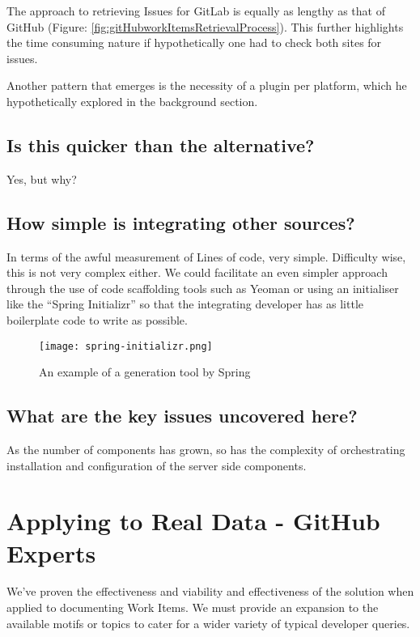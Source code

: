 The approach to retrieving Issues for GitLab is equally as lengthy as that of GitHub (Figure: \ref{fig:gitHubworkItemsRetrievalProcess}). This further highlights the time consuming nature if hypothetically one had to check both sites for issues.

Another pattern that emerges is the necessity of a plugin per platform, which he hypothetically explored in the background section.

\subsection{Is this quicker than the alternative?}

Yes, but why?

\subsection{How simple is integrating other sources?}

In terms of the awful measurement of Lines of code, very simple. Difficulty wise, this is not very complex either. We could facilitate an even simpler approach through the use of code scaffolding tools such as Yeoman or using an initialiser like the ``Spring Initializr'' so that the integrating developer has as little boilerplate code to write as possible.

\begin{figure}[h!]
	\centering
	\texttt{[image: spring-initializr.png]}
	\label{fig:springExample}
	\caption{An example of a generation tool by Spring}
\end{figure}

\subsection{What are the key issues uncovered here?}

As the number of components has grown, so has the complexity of orchestrating installation and configuration of the server side components. 

\section{Applying to Real Data - GitHub Experts}

We've proven the effectiveness and viability and effectiveness of the solution when applied to documenting Work Items. We must provide an expansion to the available motifs or topics to cater for a wider variety of typical developer queries.


